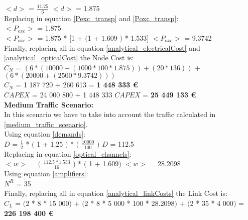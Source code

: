 $<d>$ = $\frac{11.25}{6}$ \qquad \qquad $<d>$ = 1.875\\

Replacing in equation \ref{Pexc_transp} and \ref{Poxc_transp}:\\

$<P_{exc}>$ = 1.875\\

$<P_{oxc}>$ = 1.875 * $[$1 + $($1 + $1.609$ $)$ * 1.533$]$ \qquad \quad $<P_{oxc}>$ = 9.3742 \\

Finally, replacing all in equation \ref{analytical_electricalCost} and \ref{analytical_opticalCost} the Node Cost is:\\

$C_N$ = $\left(6 * (10 000 + (1 000 * 100 * 1.875)) + (20 * 136)\right)$ + $\left(6*(20 000 + (2 500 * 9.3742 ) ) \right)$\\

$C_N$ = 1 187 720 + 260 613 = \textbf{1 448 333 \euro}\\

$CAPEX$ = 24 000 800 + 1 448 333 \qquad \qquad $CAPEX$ = \textbf{25 449 133 \euro}\\

\textbf{Medium Traffic Scenario:}\\

In this scenario we have to take into account the traffic calculated in \ref{medium_traffic_scenario}.\\

Using equation \ref{demands}:\\

$D$ = $\frac{1}{2}$ * $($ 1 + 1.25 $)$ * $($ $\frac{10000}{100}$ $)$ \qquad \qquad $D$ = 112.5\\

Replacing in equation \ref{optical_channels}:\\

$<w>$ = $($ $\frac{112.5 * 1.533}{16}$ $)$ * $($ 1 + 1.609$)$ \qquad \qquad $<w>$ = 28.2098\\

Using equation \ref{amplifiers}:\\

$N^R$ = 35\\

Finally, replacing all in equation \ref{analytical_linkCosts} the Link Cost is:\\

$C_L$ = $($2 * 8 * 15 000$)$ + $($2 * 8 * 5 000 * 100 * 28.2098$)$ + $($2 * 35 * 4 000$)$ = \textbf{226 198 400 \euro}\\

